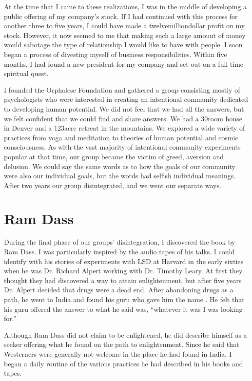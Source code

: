 \documentclass[a5paper,10pt,english]{book}
\begin{document}
\sphinxAtStartPar
At the time that I came to these realizations, I was in the middle of
developing a public offering of my company’s stock. If I had continued
with this process for another three to five years, I could have made a
twelve\sphinxhyphen{}million\sphinxhyphen{}dollar profit on my stock. However, it now seemed to me
that making such a large amount of money would sabotage the type of
relationship I would like to have with people. I soon began a process of
divesting myself of business responsibilities. Within five months, I had
found a new president for my company and set out on a full time
spiritual quest.

\sphinxAtStartPar
I founded the Orphalese Foundation and gathered a group consisting
mostly of psychologists who were interested in creating an intentional
community dedicated to developing human potential. We did not feel that
we had all the answers, but we felt confident that we could find and
share answers. We had a 30\sphinxhyphen{}room house in Denver and a 123\sphinxhyphen{}acre retreat
in the mountains. We explored a wide variety of practices from yoga and
meditation to theories of human potential and cosmic consciousness. As
with the vast majority of intentional community experiments popular at
that time, our group became the victim of greed, aversion and delusion.
We could say the same words as to how the goals of our community were
also our individual goals, but the words had selfish individual
meanings. After two years our group disintegrated, and we went our
separate ways.


\section{Ram Dass}
\label{\detokenize{preface:ram-dass}}
\sphinxAtStartPar
During the final phase of our groups’ disintegration, I discovered the
book  by Ram Dass. I was particularly inspired by the
audio tapes of his talks. I could identify with his stories of
experiments with LSD at Harvard in the early sixties when he was Dr.
Richard Alpert working with Dr. Timothy Leary. At first they thought
they had discovered a way to attain enlightenment, but after five years
Dr. Alpert decided that drugs were a dead end. After abandoning drugs as
a path, he went to India and found his guru who gave him the name . He felt that his guru offered the answer to what he said
was, “whatever it was I was looking for.”

\sphinxAtStartPar
Although Ram Dass did not claim to be enlightened, he did describe
himself as a seeker offering what he found on the path to enlightenment.
Since he said that Westerners were generally not welcome in the place he
had found in India, I began a daily routine of the various practices he
had described in his books and tapes.
\end{document}
